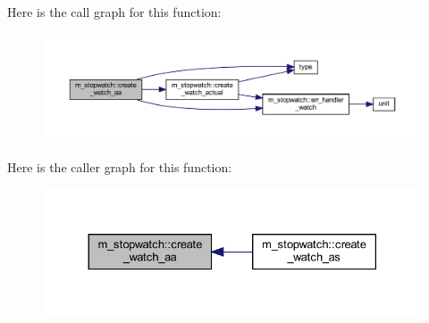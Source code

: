 Here is the call graph for this function\+:
\nopagebreak
\begin{figure}[H]
\begin{center}
\leavevmode
\includegraphics[width=350pt]{namespacem__stopwatch_a20bb67096d0fa8c6d12c8ae0022cc815_cgraph}
\end{center}
\end{figure}
Here is the caller graph for this function\+:
\nopagebreak
\begin{figure}[H]
\begin{center}
\leavevmode
\includegraphics[width=330pt]{namespacem__stopwatch_a20bb67096d0fa8c6d12c8ae0022cc815_icgraph}
\end{center}
\end{figure}
\mbox{\label{namespacem__stopwatch_aa5b637cf7ea111bd835ea3c0224ae8d6}} 
